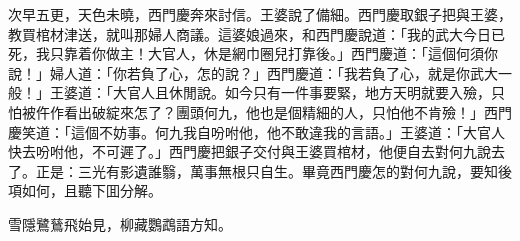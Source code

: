 次早五更，天色未曉，西門慶奔來討信。王婆說了備細。西門慶取銀子把與王婆，教買棺材津送，就叫那婦人商議。這婆娘過來，和西門慶說道：「我的武大今日已死，我只靠着你做主！大官人，休是網巾圈兒打靠後。」西門慶道：「這個何須你說！」婦人道：「你若負了心，怎的說？」西門慶道：「我若負了心，就是你武大一般！」王婆道：「大官人且休閒說。如今只有一件事要緊，地方天明就要入殮，只怕被仵作看出破綻來怎了？團頭何九，他也是個精細的人，只怕他不肯殮！」西門慶笑道：「這個不妨事。何九我自吩咐他，他不敢違我的言語。」王婆道：「大官人快去吩咐他，不可遲了。」西門慶把銀子交付與王婆買棺材，他便自去對何九說去了。正是：三光有影遺誰翳，萬事無根只自生。畢竟西門慶怎的對何九說，要知後項如何，且聽下囬分解。
\begin{myquote}
雪隱鷺鶿飛始見，柳藏鸚鵡語方知。
\end{myquote}

